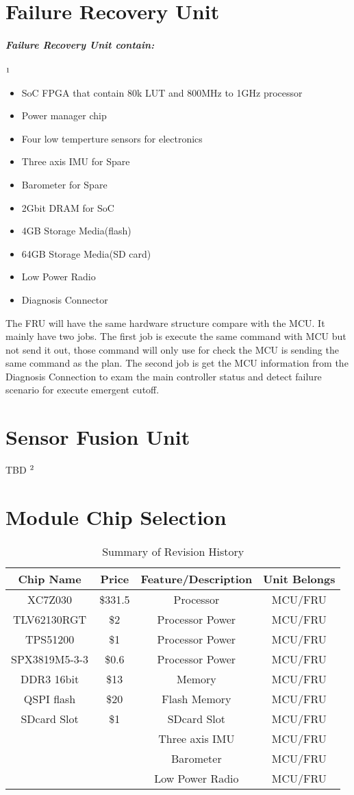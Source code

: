 \documentclass[12pt,article]{memoir}
\begin{document}
\section{Failure Recovery Unit}
\subparagraph{Failure Recovery Unit contain:}$\footnote{The same with the MCU}$
\begin{itemize}
	\item SoC FPGA that contain 80k LUT and 800MHz to 1GHz processor
	\item Power manager chip
	\item Four low temperture sensors for electronics
	\item Three axis IMU for Spare
	\item Barometer for Spare
	\item 2Gbit DRAM for SoC
	\item 4GB Storage Media(flash)
	\item 64GB Storage Media(SD card)
	\item Low Power Radio
	\item Diagnosis Connector
\end{itemize}
The FRU will have the same hardware structure compare with the MCU. It mainly have two jobs. The first job is execute the same command with MCU but not send it out, those command will only use for check the MCU is sending the same command as the plan. The second job is get the MCU information from the Diagnosis Connection to exam the main controller status and detect failure scenario for execute emergent cutoff.
\section{Sensor Fusion Unit}
TBD $\footnote{This unit will not be avaliable in the first version.}$
\newpage
\section{Module Chip Selection}
\begin{table}[H]
	\centering
	\begin{tabu}{ c | c | c | c }
		Chip Name & Price & Feature/Description & Unit Belongs\\ \hline
		 XC7Z030 & \$331.5 & Processor & MCU/FRU \\
		 TLV62130RGT & \$2 & Processor Power & MCU/FRU \\
		 TPS51200 & \$1 & Processor Power & MCU/FRU \\
		 SPX3819M5-3-3 & \$0.6 & Processor Power & MCU/FRU \\
		 DDR3 16bit& \$13 & Memory & MCU/FRU \\
		 QSPI flash & \$20 & Flash Memory & MCU/FRU \\
		 SDcard Slot & \$1 & SDcard Slot & MCU/FRU \\
		 &  & Three axis IMU & MCU/FRU \\
		 &  & Barometer & MCU/FRU \\
		 &  & Low Power Radio & MCU/FRU \\
	\end{tabu}
	\caption{Summary of Revision History}
	\label{tab:slc}
\end{table}
\end{document}
